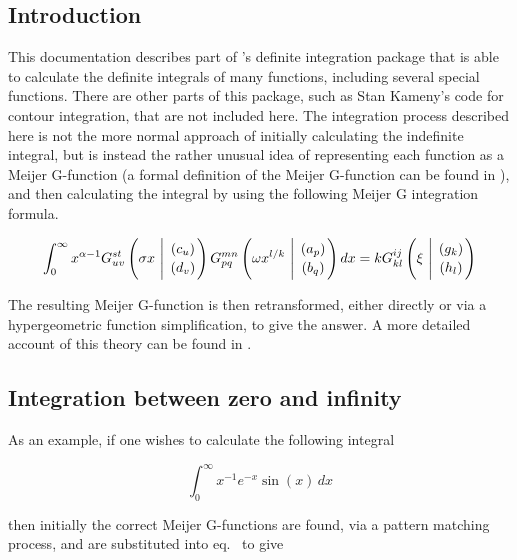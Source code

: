 

\subsection{Introduction}
\ifdefined{}\else
\newcommand{\MeijerGparams}[2]{\genfrac{}{}{0pt}{}{#1}{#2}}
\fi
This documentation describes part of \REDUCE's definite
integration package that is able to calculate the definite integrals of
many functions, including several special functions.  There are other
parts of this package, such as Stan Kameny's code for contour integration,
that are not included here.  The integration process described here is not
the more normal approach of initially calculating the indefinite integral,
but is instead the rather unusual idea of representing each function as a
Meijer G-function (a formal definition of the Meijer G-function can be
found in \cite {Prudnikov:90c}), and then calculating the integral by using
the following Meijer G integration formula.

\begin{equation}
\int_{0}^{\infty} x^{\alpha-1} G^{s t}_{u v}
\left( \sigma x \  \Bigg\vert \  \MeijerGparams{( c_u)}{(d_v)} \right)
G^{m n}_{p q} \left( \omega x^{l/k} \  \Bigg\vert \ \MeijerGparams{(a_p)}{(b_q)}
\right) dx = k G^{i j}_{k l} \left( \xi \ \Bigg\vert \
\MeijerGparams{(g_k)}{(h_l)} \right) \label{defint:eq1}
\end{equation}

The resulting Meijer G-function is then retransformed, either directly
or via a hypergeometric function simplification, to give
the answer. A more detailed account of this theory can be found in
\cite {Adamchik90}.

\subsection{Integration between zero and infinity}

As an example, if one wishes to calculate the following integral

\[
\int_{0}^{\infty} x^{-1} e^{-x} \sin(x) \, dx
\]

then initially the  correct Meijer G-functions are found, via a
pattern matching
process, and are substituted into eq.~ to give

